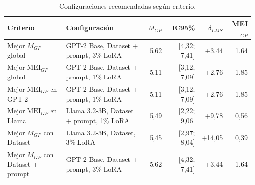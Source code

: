 \begin{table}[H]
\centering\footnotesize
\setlength{\tabcolsep}{4pt}
\caption{Configuraciones recomendadas según criterio.}
\label{tab:ex_decision_recomendacion}
\begin{tabularx}{\linewidth}{@{} L Y r r r r @{}}
\toprule
\textbf{Criterio} & \textbf{Configuración} & \textbf{$M_{GP}$} & \textbf{IC95\%} & \textbf{$\delta_{LMS}$} & \textbf{MEI$_{GP}$} \\
\midrule
Mejor $M_{GP}$ global & GPT-2 Base, Dataset + prompt, 3\% LoRA & 5,62 & [4,32; 7,41] & +3,44 & 1,64 \\
Mejor $\mathrm{MEI}_{GP}$ global & GPT-2 Base, Dataset + prompt, 1\% LoRA & 5,11 & [3,12; 7,09] & +2,76 & 1,85 \\
Mejor $\mathrm{MEI}_{GP}$ en GPT-2 & GPT-2 Base, Dataset + prompt, 1\% LoRA & 5,11 & [3,12; 7,09] & +2,76 & 1,85 \\
Mejor $\mathrm{MEI}_{GP}$ en Llama & Llama 3.2-3B, Dataset + prompt, 1\% LoRA & 5,49 & [2,22; 9,06] & +9,78 & 0,56 \\
Mejor $M_{GP}$ con Dataset & Llama 3.2-3B, Dataset, 3\% LoRA & 5,45 & [2,97; 8,04] & +14,05 & 0,39 \\
Mejor $M_{GP}$ con Dataset + prompt & GPT-2 Base, Dataset + prompt, 3\% LoRA & 5,62 & [4,32; 7,41] & +3,44 & 1,64 \\
\bottomrule
\end{tabularx}
\end{table}